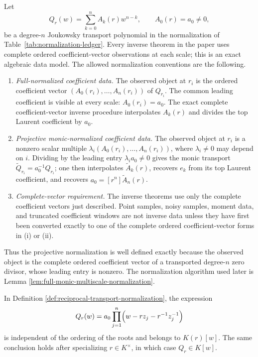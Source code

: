 \begin{definition}\label{def:transport-coefficient-observations}
Let
\[
Q_r(w)=\sum_{k=0}^{n}A_k(r)w^{n-k},
\qquad A_0(r)=a_0\ne0,
\]
be a degree-\(n\) Joukowsky transport polynomial in the normalization
of Table~\ref{tab:normalization-ledger}.  Every
inverse theorem in the paper uses complete ordered coefficient-vector
observations at each scale; this is an exact algebraic data model.  The
allowed normalization conventions are the following.
\begin{enumerate}[label=\textup{(\roman*)},leftmargin=*]
\item \emph{Full-normalized coefficient data.}
The observed object at \(r_i\) is the ordered coefficient vector
\((A_0(r_i),\dots,A_n(r_i))\) of \(Q_{r_i}\).  The common leading
coefficient is visible at every scale: \(A_0(r_i)=a_0\).  The exact
complete coefficient-vector inverse procedure interpolates \(A_k(r)\) and divides the top Laurent coefficient by
\(a_0\).
\item \emph{Projective monic-normalized coefficient data.}
The observed object at \(r_i\) is a nonzero scalar multiple
\(\lambda_i(A_0(r_i),\dots,A_n(r_i))\), where \(\lambda_i\ne0\) may
depend on \(i\).  Dividing by the leading entry \(\lambda_i a_0\ne0\)
gives the monic transport \(\widetilde Q_{r_i}=a_0^{-1}Q_{r_i}\); one
then interpolates \(\widetilde A_k(r)\), recovers \(e_k\) from its top
Laurent coefficient, and recovers \(a_0=[r^n]\widetilde A_n(r)\).
\item \emph{Complete-vector requirement.}
The inverse theorems use only the complete coefficient vectors just
described.  Point samples, noisy samples, moment data, and truncated
coefficient windows are not inverse data unless they have first been
converted exactly to one of the complete ordered coefficient-vector
forms in \textup{(i)} or \textup{(ii)}.
\end{enumerate}
Thus the projective normalization is well defined exactly because the
observed object is the complete ordered coefficient vector of a
transported degree-\(n\) zero divisor, whose leading entry is nonzero.
The normalization algorithm used later is Lemma
\ref{lem:full-monic-multiscale-normalization}.
\end{definition}

\begin{lemma}\label{lem:transport-coefficient-descent}
In Definition \ref{def:reciprocal-transport-normalization}, the expression
\[
Q_r(w)=a_0\prod_{j=1}^{n}\Bigl(w-r z_j-r^{-1}z_j^{-1}\Bigr)
\]
is independent of the ordering of the roots and belongs to \(K(r)[w]\).  The same conclusion holds after specializing \(r\in K^\times\), in which case \(Q_r\in K[w]\).
\end{lemma}

